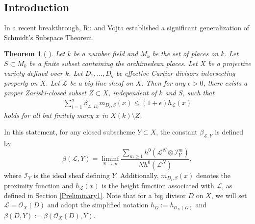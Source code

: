 \documentclass[10pt]{amsart}
\numberwithin{equation}{section}
\theoremstyle{plain}
\newtheorem{theorem}{Theorem}[section]
\theoremstyle{definition}
\begin{document}
 \subsection{Introduction}
 In a recent breakthrough, Ru and Vojta established a significant generalization of Schmidt's Subspace Theorem.  
 \begin{theorem}[{ \cite[General Theorem (Arithmetic Part)]{RV20}}]\label{Ru-Vojta} Let $k$ be a number field and $M_k$ be the set of places on $k$. Let $S\subset M_k$ be a finite subset containing the archimedean places.  Let $X$ be a projective variety defined over $k$.
 Let $D_1,\hdots,D_q$  be effective Cartier divisors intersecting properly on $X$.
 Let  $\mathcal L$ be a big line sheaf on $X$.  Then for any $\epsilon>0$, there exists a   proper Zariski-closed subset 
 $Z\subset X$, independent of $k$ and $S$,  such that
\begin{align}
 \sum_{i=1}^q \beta_{\mathcal L, D_i} m_{D_i,S}(x)\le (1+\epsilon) h_{\mathcal L}(x)
\end{align}
holds for  all but finitely many $x$ in  $X(k)\setminus Z$.
\end{theorem}
In this statement, for any closed subscheme \(Y\subset X\), the constant $\beta_{\mathcal{L}, Y}$ is defined by  
\begin{equation*}
  \beta(\mathscr L, Y)
    = \liminf_{N\to\infty}
      \frac {\sum_{m\ge 1}h^0(\mathscr L^N\otimes {\mathscr I}_{Y}^{m})} {Nh^0(\mathscr L^N)},
\end{equation*}
where ${\mathscr I}_{Y}$ is the ideal sheaf defining $Y$. Additionally, $m_{D_i,S}(x)$ denotes  the proximity function and $h_{\mathcal L} (x)$ is the height function associated with $\mathcal L$, as defined in Section \ref{Preliminary1}.  Note that  for a big divisor $D$ on $X$, we will set $\mathcal L=\mathcal O_X(D)$ and adopt the simplified notation $h_{D}:=h_{\mathcal O_X(D)}$ and  $\beta(D, Y):= \beta(\mathcal O_X(D), Y)$.
\end{document}
